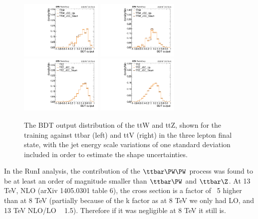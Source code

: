 \begin{figure}[htb]
	\centering 
\includegraphics[width=0.35\textwidth]{plots_irreduciblebkg/3l/JEC_ttW/kinMVA_3l_ttbar}
\includegraphics[width=0.35\textwidth]{plots_irreduciblebkg/3l/JEC_ttW/kinMVA_3l_ttV}
\includegraphics[width=0.35\textwidth]{plots_irreduciblebkg/3l/JEC_ttZ/kinMVA_3l_ttbar}
\includegraphics[width=0.35\textwidth]{plots_irreduciblebkg/3l/JEC_ttZ/kinMVA_3l_ttV}
	\caption{The BDT output distribution of the ttW and ttZ, shown for the training against ttbar 
	(left) and ttV (right) in the three lepton final state, with the jet energy scale 
	variations of one standard deviation included in order to estimate the shape uncertainties.}
	\label{fig:TTVJEConBDTshape3l}
\end{figure}



In the RunI analysis, the contribution of the $\ttbar\PW\PW$ process was found to be
at least an order of magnitude smaller than $\ttbar\PW$ and
$\ttbar\Z$. At 13 TeV, NLO (arXiv 1405.0301 table 6), the cross section is a factor of ~5 higher than at 8 TeV (partially because of the k factor as at 8 TeV we only had LO, and 13 TeV NLO/LO ~ 1.5). Therefore if it was negligible at 8 TeV it still is. 

